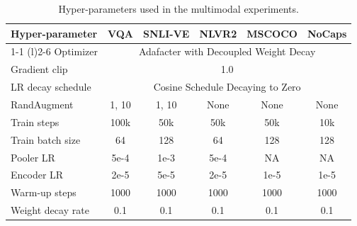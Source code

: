 \begin{table}[!ht]
\small
\centering
\begin{tabular}{@{}lccccc}
    \toprule
    \bf Hyper-parameter & \bf VQA & \bf SNLI-VE & \bf NLVR2 & \bf MSCOCO & \bf NoCaps \\
    \cmidrule(r){1-1} \cmidrule(l){2-6}
    Optimizer        & \multicolumn{5}{c}{Adafacter with Decoupled Weight Decay} \\
    Gradient clip         & \multicolumn{5}{c}{1.0} \\
    LR decay schedule     & \multicolumn{5}{c}{Cosine Schedule Decaying to Zero} \\
    RandAugment           & 1, 10     & 1, 10   &  None & None & None \\
    Train steps          &  100k      &  50k     &  50k      &    50k  & 10k  \\
    Train batch size      & 64      & 128     & 64     & 128    & 128\\
    Pooler LR    & 5e-4     & 1e-3    & 5e-4     & NA    & NA\\
    Encoder LR    & 2e-5    & 5e-5    & 2e-5   & 1e-5    & 1e-5\\
    Warm-up steps              & 1000 & 1000    & 1000 & 1000  & 1000    \\
    Weight decay rate     & 0.1      & 0.1    & 0.1     & 0.1  & 0.1   \\
    \bottomrule
\end{tabular}
\caption{Hyper-parameters used in the multimodal experiments.}
\label{tabs:detailed_vl}
\end{table}